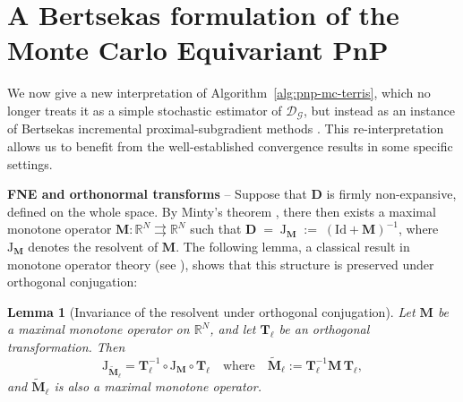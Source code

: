 \documentclass{article}
\newtheorem{lemma}{Lemma}
\newcommand{\R}{\mathbb{R}}
\newcommand{\Id}{\mathrm{Id}}
\begin{document}
\section{A Bertsekas formulation of the Monte Carlo Equivariant PnP}
\label{sec:bertsekas-reading}

We now give a new interpretation of Algorithm~\eqref{alg:pnp-mc-terris},
which no longer treats it as a simple stochastic estimator of
$\mathcal{D}_\mathcal{G}$, but instead as an instance of Bertsekas
incremental proximal-subgradient methods \cite{Bertsekas2011}. This re-interpretation allows us to benefit from the well-established convergence results in some specific settings.\\\vspace{-0.2cm}


\noindent \textbf{FNE and orthonormal transforms} --  Suppose that $\mathbf{D}$ is firmly non-expansive, defined on the whole space. By Minty's
theorem \cite{Minty1962}, there then exists a maximal monotone
operator $\mathbf{M}\colon\R^N \rightrightarrows\R^N$ such that
$\mathbf{D} \;=\; \mathrm{J}_{\mathbf{M}} \;:=\; (\Id+\mathbf{M})^{-1}$,
where $\mathrm{J}_{\mathbf{M}}$ denotes the resolvent of $\mathbf{M}$. The following lemma, a
classical result in monotone operator theory (see \cite{CombettesPesquet2011,BauschkeCombettes2017}), shows that this structure is preserved
under orthogonal conjugation:

\begin{lemma}[Invariance of the resolvent under orthogonal conjugation]
\label{lem:conjugaison-resolvante}
Let $\mathbf{M}$ be a maximal monotone operator on $\R^N$, and let $\mathbf{T}_\ell$ be an
orthogonal transformation. Then
\[
  \mathrm{J}_{\widetilde{\mathbf{M}}_\ell} = \mathbf{T}_\ell^{-1} \circ \mathrm{J}_{\mathbf{M}}  \circ \mathbf{T}_\ell \quad \text{where} \quad \widetilde{\mathbf{M}}_\ell := \mathbf{T}_\ell^{-1} \mathbf{M}\, \mathbf{T}_\ell,
\]
and $\widetilde{\mathbf{M}}_\ell$ is also a maximal monotone operator.
\end{lemma}
\end{document}
